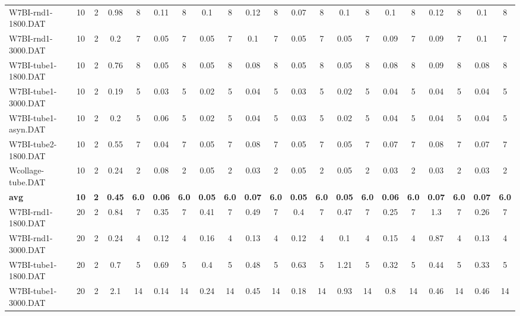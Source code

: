 \begin{sidewaystable}[!ht]
{\begin{tabular}{lcccccccccccccccccccc}
W7BI-rnd1-1800.DAT & 10 & 2 & 0.98 & 8 & 0.11 & 8 & 0.1 & 8 & 0.12 & 8 &  \textcolor{blue2}{0.07} & 8 & 0.1 & 8 & 0.1 & 8 & 0.12 & 8 & 0.1 & 8 \\
W7BI-rnd1-3000.DAT & 10 & 2 & 0.2 & 7 &  \textcolor{blue2}{0.05} & 7 &  \textcolor{blue2}{0.05} & 7 & 0.1 & 7 &  \textcolor{blue2}{0.05} & 7 &  \textcolor{blue2}{0.05} & 7 & 0.09 & 7 & 0.09 & 7 & 0.1 & 7 \\
W7BI-tube1-1800.DAT & 10 & 2 & 0.76 & 8 &  \textcolor{blue2}{0.05} & 8 &  \textcolor{blue2}{0.05} & 8 & 0.08 & 8 &  \textcolor{blue2}{0.05} & 8 &  \textcolor{blue2}{0.05} & 8 & 0.08 & 8 & 0.09 & 8 & 0.08 & 8 \\
W7BI-tube1-3000.DAT & 10 & 2 & 0.19 & 5 & 0.03 & 5 &  \textcolor{blue2}{0.02} & 5 & 0.04 & 5 & 0.03 & 5 &  \textcolor{blue2}{0.02} & 5 & 0.04 & 5 & 0.04 & 5 & 0.04 & 5 \\
W7BI-tube1-asyn.DAT & 10 & 2 & 0.2 & 5 & 0.06 & 5 &  \textcolor{blue2}{0.02} & 5 & 0.04 & 5 & 0.03 & 5 &  \textcolor{blue2}{0.02} & 5 & 0.04 & 5 & 0.04 & 5 & 0.04 & 5 \\
W7BI-tube2-1800.DAT & 10 & 2 & 0.55 & 7 &  \textcolor{blue2}{0.04} & 7 & 0.05 & 7 & 0.08 & 7 & 0.05 & 7 & 0.05 & 7 & 0.07 & 7 & 0.08 & 7 & 0.07 & 7 \\
Wcollage-tube.DAT & 10 & 2 & 0.24 & 2 & 0.08 & 2 & 0.05 & 2 &  \textcolor{blue2}{0.03} & 2 & 0.05 & 2 & 0.05 & 2 &  \textcolor{blue2}{0.03} & 2 &  \textcolor{blue2}{0.03} & 2 &  \textcolor{blue2}{0.03} & 2 \\
\cline{1-21} \textbf{avg} & \textbf{10} & \textbf{2} & \textbf{0.45} & \textbf{6.0} & \textbf{0.06} & \textbf{6.0} & \textbf{0.05} & \textbf{6.0} & \textbf{0.07} & \textbf{6.0} & \textbf{0.05} & \textbf{6.0} & \textbf{0.05} & \textbf{6.0} & \textbf{0.06} & \textbf{6.0} & \textbf{0.07} & \textbf{6.0} & \textbf{0.07} & \textbf{6.0} \\ \cline{1-21}
W7BI-rnd1-1800.DAT & 20 & 2 & 0.84 & 7 & 0.35 & 7 & 0.41 & 7 & 0.49 & 7 & 0.4 & 7 & 0.47 & 7 &  \textcolor{blue2}{0.25} & 7 & 1.3 & 7 & 0.26 & 7 \\
W7BI-rnd1-3000.DAT & 20 & 2 & 0.24 & 4 & 0.12 & 4 & 0.16 & 4 & 0.13 & 4 & 0.12 & 4 &  \textcolor{blue2}{0.1} & 4 & 0.15 & 4 & 0.87 & 4 & 0.13 & 4 \\
W7BI-tube1-1800.DAT & 20 & 2 & 0.7 & 5 & 0.69 & 5 & 0.4 & 5 & 0.48 & 5 & 0.63 & 5 & 1.21 & 5 &  \textcolor{blue2}{0.32} & 5 & 0.44 & 5 & 0.33 & 5 \\
W7BI-tube1-3000.DAT & 20 & 2 & 2.1 & 14 &  \textcolor{blue2}{0.14} & 14 & 0.24 & 14 & 0.45 & 14 & 0.18 & 14 & 0.93 & 14 & 0.8 & 14 & 0.46 & 14 & 0.46 & 14 \\

\end{tabular}}
\end{sidewaystable}
